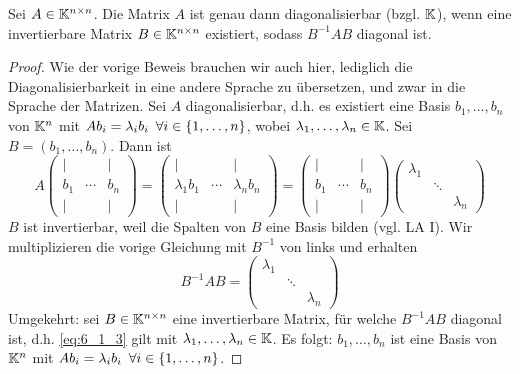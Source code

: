 \begin{propn}
	Sei $ A \in \mathbb K^{n \times n} $. Die Matrix $ A $ ist genau dann diagonalisierbar (bzgl. $\mathbb K$), wenn eine invertierbare Matrix $ B \in \mathbb K^{n \times n} $ existiert, sodass $ B^{-1}AB $ diagonal ist.
\end{propn}
\begin{proof}
	Wie der vorige Beweis brauchen wir auch hier, lediglich die Diagonalisierbarkeit in eine andere Sprache zu übersetzen, und zwar in die Sprache der Matrizen. 
	Sei $ A $ diagonalisierbar, d.h. es existiert eine Basis $ b_1, \ldots, b_n $ von $ \mathbb K^n $ mit $ Ab_i = \lambda_ib_i \enspace\forall i \in \{ 1,\ldots,n \} $, wobei $ \lambda_1, \ldots, \lambda_n \in \mathbb K $. Sei $ B = (b_1, \ldots, b_n) $. Dann ist
	\begin{equation*}
		A \begin{pmatrix}
			| && | \\
			b_1 & \cdots & b_n \\
			| && |
		\end{pmatrix} = \begin{pmatrix}
			| && | \\
			\lambda_1b_1 & \cdots & \lambda_nb_n \\
			| && |
		\end{pmatrix} = \begin{pmatrix}
			| && | \\
			b_1 & \cdots & b_n \\
			| && |
		\end{pmatrix} \begin{pmatrix}
			\lambda_1 && \\
			& \ddots & \\
			&& \lambda_n
		\end{pmatrix}
	\end{equation*}
	$ B $ ist invertierbar, weil die Spalten von $ B $ eine Basis bilden (vgl. LA I). Wir multiplizieren die vorige Gleichung mit $ B^{-1} $ von links und erhalten
	\begin{equation}
		B^{-1}AB = \begin{pmatrix}
			\lambda_1 && \\
			& \ddots & \\
			&& \lambda_n
		\end{pmatrix}
		\label{eq:6_1_3}
	\end{equation}
	Umgekehrt: sei $ B \in \mathbb K^{n \times n} $ eine invertierbare Matrix, für welche $ B^{-1}AB $ diagonal ist, d.h. \eqref{eq:6_1_3} gilt mit $ \lambda_1, \ldots, \lambda_n \in \mathbb K $. Es folgt: $ b_1, \ldots, b_n $ ist eine Basis von $ \mathbb K^n $ mit $ Ab_i = \lambda_ib_i \enspace\forall i \in \{ 1,\ldots,n \} $.
\end{proof}

